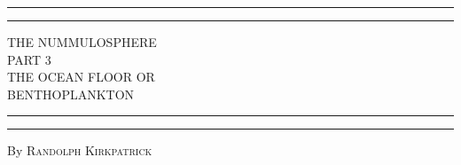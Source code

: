 \documentclass[a4paper, 12pt, oneside]{article}
\begin{document}
\begin{titlepage} %
	\centering %
	\scshape %

	
	\rule{\textwidth}{1.6pt}\vspace*{-\baselineskip}\vspace*{2pt} %
	\rule{\textwidth}{0.4pt} %
	
	\vspace{0.75\baselineskip} %
	
	{\LARGE THE NUMMULOSPHERE\\ PART 3\\ THE OCEAN FLOOR OR\\ BENTHOPLANKTON\\} %
	
	\vspace{0.75\baselineskip} %
	
	\rule{\textwidth}{0.4pt}\vspace*{-\baselineskip}\vspace{3.2pt} %
	\rule{\textwidth}{1.6pt} %
	
	\vspace{1\baselineskip} %
	
	
	{By \scshape\Large Randolph Kirkpatrick\\} %
	
	\vspace*{1\baselineskip} %
	
	
	\vspace{1\baselineskip} %

	
	

\end{titlepage}
\end{document}
